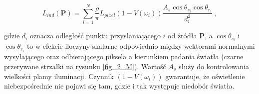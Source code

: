 		\begin{equation}
		L_{ind}(\mathbf{P}) = \sum_{i=1}^{N}\frac{\rho}{\pi}L_{pixel}(1 - V(\omega_{i}))\frac{A_{s}\cos\theta_{s_{i}}\cos\theta_{r_{i}}}{d_{i}^2} \ ,
		\end{equation}
		
		gdzie \(d_{i}\) oznacza odległość punktu przysłaniającego \(i\) od źródła \(\mathbf{P}\), a \(\cos\theta_{s_{i}}\) i \(\cos\theta_{r_{i}}\) to w efekcie iloczyny skalarne odpowiednio między wektorami normalnymi wysyłającego oraz odbierającego piksela a kierunkiem padania światła (czarne przerywane strzałki na rysunku \ref{fig_2_M}). Wartość \(A_{s}\) służy do kontrolowania wielkości plamy iluminacji. Czynnik \((1 - V(\omega_{i}))\) gwarantuje, że oświetlenie niebezpośrednie nie pojawi się tam, gdzie i tak występuje niedobór światła.
